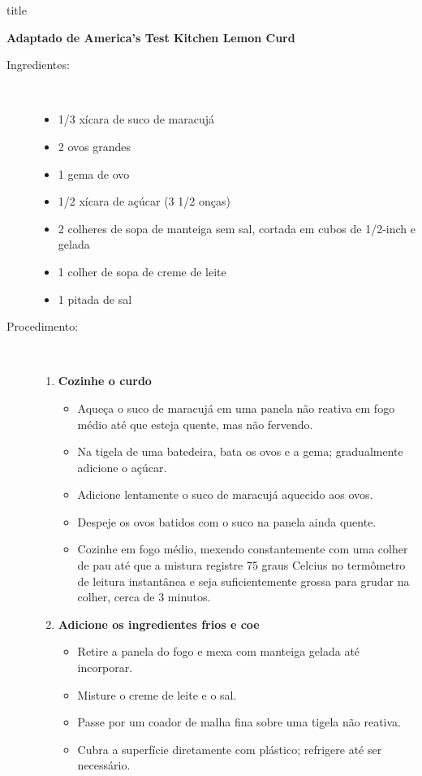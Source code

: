 \documentclass [11pt, letterpaper] {article}
\begin{document}
 {title}

\begin {flushright}
{\bf Adaptado de America's Test Kitchen Lemon Curd}
\end {flushright}

\begin {description}

\item [Ingredientes:] \ \\
\begin {itemize}
\item 1/3 xícara de suco de maracujá
\item 2 ovos grandes
\item 1 gema de ovo
\item 1/2 xícara de açúcar (3 1/2 onças)
\item 2 colheres de sopa de manteiga sem sal, cortada em cubos de 1/2-inch e gelada
\item 1 colher de sopa de creme de leite
\item 1 pitada de sal
\end {itemize}

\item [Procedimento:] \ \\
\begin {enumerate}
\item {\bf Cozinhe o curdo}
\begin {itemize}
\item Aqueça o suco de maracujá em uma panela não reativa em fogo médio até que esteja quente, mas não fervendo. 
\item Na tigela de uma batedeira, bata os ovos e a gema; gradualmente adicione o açúcar.
\item Adicione lentamente o suco de maracujá aquecido aos ovos.
\item Despeje os ovos batidos com o suco na panela ainda quente.
\item Cozinhe em fogo médio, mexendo constantemente com uma colher de pau até que a mistura registre 75 graus Celcius  no termômetro de leitura instantânea e seja suficientemente grossa para grudar na colher, cerca de 3 minutos.
\end {itemize}
\item {\bf Adicione os ingredientes frios e coe}
\begin {itemize}
\item Retire a panela do fogo e mexa com manteiga gelada até incorporar.
\item Misture o creme de leite e o sal.
\item Passe por um coador de malha fina sobre uma tigela não reativa.
\item Cubra a superfície diretamente com plástico; refrigere até ser necessário.
\end {itemize}
\end {enumerate}

\end {description}
\end{document}
